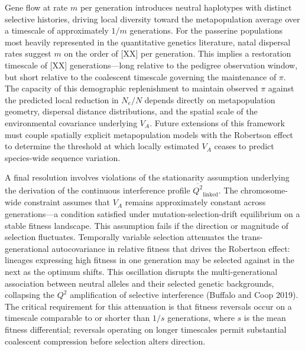 \documentclass[12pt]{article}
\begin{document}
Gene flow at rate $m$ per generation introduces neutral haplotypes with distinct selective histories, driving local diversity toward the metapopulation average over a timescale of approximately $1/m$ generations. For the passerine populations most heavily represented in the quantitative genetics literature, natal dispersal rates suggest $m$ on the order of [XX] per generation. This implies a restoration timescale of [XX] generations—long relative to the pedigree observation window, but short relative to the coalescent timescale governing the maintenance of $\pi$. The capacity of this demographic replenishment to maintain observed $\pi$ against the predicted local reduction in $N_e/N$ depends directly on metapopulation geometry, dispersal distance distributions, and the spatial scale of the environmental covariance underlying $V_A$. Future extensions of this framework must couple spatially explicit metapopulation models with the Robertson effect to determine the threshold at which locally estimated $V_A$ ceases to predict species-wide sequence variation.

A final resolution involves violations of the stationarity assumption underlying the derivation of the continuous interference profile $\overline{Q^2}_\text{linked}$. The chromosome-wide constraint assumes that $V_A$ remains approximately constant across generations—a condition satisfied under mutation-selection-drift equilibrium on a stable fitness landscape. This assumption fails if the direction or magnitude of selection fluctuates. Temporally variable selection attenuates the trans-generational autocovariance in relative fitness that drives the Robertson effect: lineages expressing high fitness in one generation may be selected against in the next as the optimum shifts. This oscillation disrupts the multi-generational association between neutral alleles and their selected genetic backgrounds, collapsing the $Q^2$ amplification of selective interference (Buffalo and Coop 2019). The critical requirement for this attenuation is that fitness reversals occur on a timescale comparable to or shorter than $1/s$ generations, where $s$ is the mean fitness differential; reversals operating on longer timescales permit substantial coalescent compression before selection alters direction.
\end{document}
